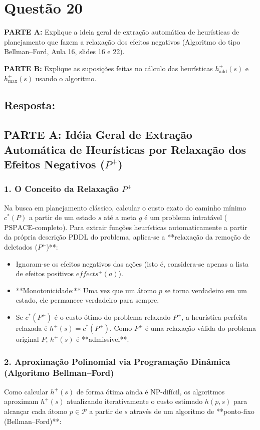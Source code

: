 \documentclass[a4paper,12pt]{article}
\begin{document}
\section*{Questão 20}


\textbf{PARTE A:} Explique a ideia geral de extração automática de heurísticas de planejamento que fazem a relaxação dos efeitos negativos (Algoritmo do tipo Bellman--Ford, Aula 16, slides 16 e 22).

\bigskip

\textbf{PARTE B:} Explique as suposições feitas no cálculo das heurísticas $h_{\text{add}}^+(s)$ e $h_{\text{max}}^+(s)$ usando o algoritmo.


\subsection*{Resposta:}

\bigskip


\subsection*{PARTE A: Idéia Geral de Extração Automática de Heurísticas por Relaxação dos Efeitos Negativos ($P^+$)}

\subsubsection*{1. O Conceito da Relaxação $P^+$}
Na busca em planejamento clássico, calcular o custo exato do caminho mínimo $c^*(P)$ a partir de um estado $s$ até a meta $g$ é um problema intratável ($\text{PSPACE-completo}$). Para extrair funções heurísticas automaticamente a partir da própria descrição PDDL do problema, aplica-se a **relaxação da remoção de deletados ($P^+$)**:
\begin{itemize}
	\item Ignoram-se os efeitos negativos das ações (isto é, considera-se apenas a lista de efeitos positivos $effects^+(a)$).
	\item **Monotonicidade:** Uma vez que um átomo $p$ se torna verdadeiro em um estado, ele permanece verdadeiro para sempre.
	\item Se $c^*(P^+)$ é o custo ótimo do problema relaxado $P^+$, a heurística perfeita relaxada é $h^+(s) = c^*(P^+)$. Como $P^+$ é uma relaxação válida do problema original $P$, $h^+(s)$ é **admissível**.
\end{itemize}

\subsubsection*{2. Aproximação Polinomial via Programação Dinâmica (Algoritmo Bellman--Ford)}
Como calcular $h^+(s)$ de forma ótima ainda é NP-difícil, os algoritmos aproximam $h^+(s)$ atualizando iterativamente o custo estimado $h(p, s)$ para alcançar cada átomo $p \in \mathcal{P}$ a partir de $s$ através de um algoritmo de **ponto-fixo (Bellman--Ford)**:
\end{document}

